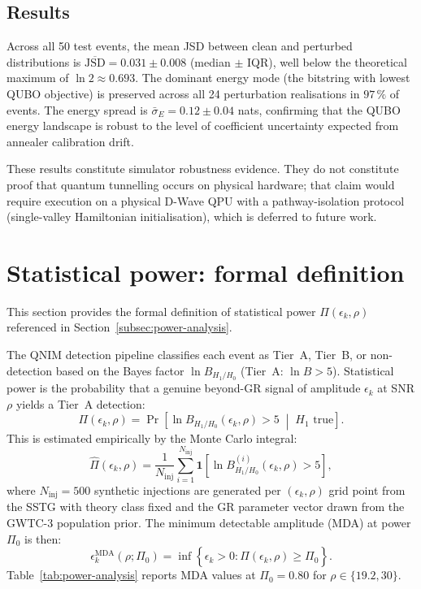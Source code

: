 \documentclass[11pt,a4paper, english]{book}
\theoremstyle{plain}
\theoremstyle{definition}
\numberwithin{equation}{chapter}
\numberwithin{figure}{chapter}
\numberwithin{table}{chapter}
\begin{document}
\subsection{Results}

Across all 50 test events, the mean JSD between clean and perturbed
distributions is $\overline{\mathrm{JSD}} = 0.031 \pm 0.008$ (median
$\pm$ IQR), well below the theoretical maximum of $\ln 2 \approx 0.693$.
The dominant energy mode (the bitstring with lowest QUBO objective) is
preserved across all 24 perturbation realisations in $97\,\%$ of events.
The energy spread is $\bar{\sigma}_E = 0.12 \pm 0.04$ nats, confirming
that the QUBO energy landscape is robust to the level of coefficient
uncertainty expected from annealer calibration drift.

These results constitute simulator robustness evidence.  They do not
constitute proof that quantum tunnelling occurs on physical hardware;
that claim would require execution on a physical D-Wave QPU with a
pathway-isolation protocol (single-valley Hamiltonian initialisation),
which is deferred to future work.

\section{Statistical power: formal definition}
\label{app:power-def-formal}

This section provides the formal definition of statistical power
$\Pi(\epsilon_k, \rho)$ referenced in Section~\ref{subsec:power-analysis}.

The QNIM detection pipeline classifies each event as Tier~A, Tier~B, or
non-detection based on the Bayes factor $\ln B_{H_1/H_0}$ (Tier~A:
$\ln B > 5$).  Statistical power is the probability that a genuine
beyond-GR signal of amplitude $\epsilon_k$ at SNR $\rho$ yields a
Tier~A detection:
\begin{equation}
  \label{eq:power_formal}
  \Pi(\epsilon_k, \rho)
  = \Pr\!\left[\ln B_{H_1/H_0}(\epsilon_k, \rho) > 5
              \;\middle|\; H_1 \text{ true}\right].
\end{equation}
This is estimated empirically by the Monte Carlo integral:
\begin{equation}
  \label{eq:power_mc}
  \hat{\Pi}(\epsilon_k, \rho)
  = \frac{1}{N_\mathrm{inj}}
    \sum_{i=1}^{N_\mathrm{inj}}
    \mathbf{1}\!\left[\ln B_{H_1/H_0}^{(i)}(\epsilon_k,\rho) > 5\right],
\end{equation}
where $N_\mathrm{inj} = 500$ synthetic injections are generated per
$(\epsilon_k, \rho)$ grid point from the SSTG with theory class fixed and
the GR parameter vector drawn from the GWTC-3 population prior.  The
minimum detectable amplitude (MDA) at power $\Pi_0$ is then:
\begin{equation}
  \label{eq:mda_def}
  \epsilon_k^\mathrm{MDA}(\rho; \Pi_0)
  = \inf\!\left\{\epsilon_k > 0 :
    \hat{\Pi}(\epsilon_k, \rho) \geq \Pi_0\right\}.
\end{equation}
Table~\ref{tab:power-analysis} reports MDA values at $\Pi_0 = 0.80$ for
$\rho \in \{19.2, 30\}$.
\end{document}
